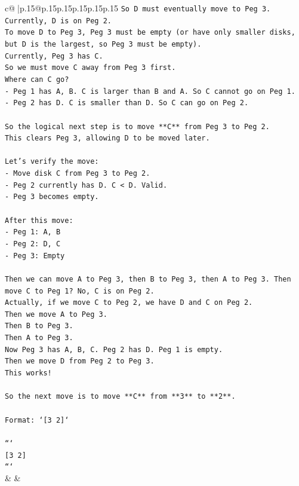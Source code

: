 \documentclass{article}
\begin{document}
{\begin{supertabular}{c@{$\;$}|p{.15\linewidth}@{}p{.15\linewidth}p{.15\linewidth}p{.15\linewidth}p{.15\linewidth}p{.15\linewidth}}
{{{\texttt{So D must eventually move to Peg 3.} \\
\texttt{Currently, D is on Peg 2.} \\
\texttt{To move D to Peg 3, Peg 3 must be empty (or have only smaller disks, but D is the largest, so Peg 3 must be empty).} \\
\texttt{Currently, Peg 3 has C.} \\
\texttt{So we must move C away from Peg 3 first.} \\
\texttt{Where can C go?} \\
\texttt{{-} Peg 1 has A, B. C is larger than B and A. So C cannot go on Peg 1.} \\
\texttt{{-} Peg 2 has D. C is smaller than D. So C can go on Peg 2.} \\
\\ 
\texttt{So the logical next step is to move **C** from Peg 3 to Peg 2.} \\
\texttt{This clears Peg 3, allowing D to be moved later.} \\
\\ 
\texttt{Let's verify the move:} \\
\texttt{{-} Move disk C from Peg 3 to Peg 2.} \\
\texttt{{-} Peg 2 currently has D. C < D. Valid.} \\
\texttt{{-} Peg 3 becomes empty.} \\
\\ 
\texttt{After this move:} \\
\texttt{{-} Peg 1: A, B} \\
\texttt{{-} Peg 2: D, C} \\
\texttt{{-} Peg 3: Empty} \\
\\ 
\texttt{Then we can move A to Peg 3, then B to Peg 3, then A to Peg 3. Then move C to Peg 1? No, C is on Peg 2.} \\
\texttt{Actually, if we move C to Peg 2, we have D and C on Peg 2.} \\
\texttt{Then we move A to Peg 3.} \\
\texttt{Then B to Peg 3.} \\
\texttt{Then A to Peg 3.} \\
\texttt{Now Peg 3 has A, B, C. Peg 2 has D. Peg 1 is empty.} \\
\texttt{Then we move D from Peg 2 to Peg 3.} \\
\texttt{This works!} \\
\\ 
\texttt{So the next move is to move **C** from **3** to **2**.} \\
\\ 
\texttt{Format: `{[}3 2{]}`} \\
\\ 
\texttt{```} \\
\texttt{{[}3 2{]}} \\
\texttt{```} \\
            }
        }
    }
    & & \\ \\


\end{supertabular}}
\end{document}
